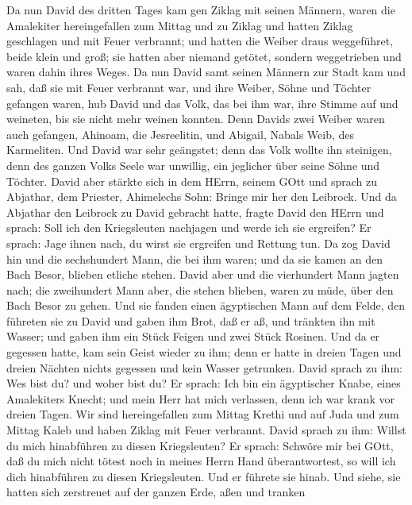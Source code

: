  Da nun David des dritten Tages kam gen Ziklag mit seinen
Männern, waren die Amalekiter hereingefallen zum Mittag und zu Ziklag
und hatten Ziklag geschlagen und mit Feuer verbrannt;  und
hatten die Weiber draus weggeführet, beide klein und groß; sie hatten
aber niemand getötet, sondern weggetrieben und waren dahin ihres Weges.
 Da nun David samt seinen Männern zur Stadt kam und sah, daß
sie mit Feuer verbrannt war, und ihre Weiber, Söhne und Töchter gefangen
waren,  hub David und das Volk, das bei ihm war, ihre Stimme
auf und weineten, bis sie nicht mehr weinen konnten.  Denn
Davids zwei Weiber waren auch gefangen, Ahinoam, die Jesreelitin, und
Abigail, Nabals Weib, des Karmeliten.  Und David war sehr
geängstet; denn das Volk wollte ihn steinigen, denn des ganzen Volks
Seele war unwillig, ein jeglicher über seine Söhne und Töchter. David
aber stärkte sich in dem HErrn, seinem GOtt  und sprach zu
Abjathar, dem Priester, Ahimelechs Sohn: Bringe mir her den Leibrock.
Und da Abjathar den Leibrock zu David gebracht hatte, 
fragte David den HErrn und sprach: Soll ich den Kriegsleuten nachjagen
und werde ich sie ergreifen? Er sprach: Jage ihnen nach, du wirst sie
ergreifen und Rettung tun.  Da zog David hin und die
sechshundert Mann, die bei ihm waren; und da sie kamen an den Bach
Besor, blieben etliche stehen.  David aber und die
vierhundert Mann jagten nach; die zweihundert Mann aber, die stehen
blieben, waren zu müde, über den Bach Besor zu gehen.  Und
sie fanden einen ägyptischen Mann auf dem Felde, den führeten sie zu
David und gaben ihm Brot, daß er aß, und tränkten ihn mit Wasser;
 und gaben ihm ein Stück Feigen und zwei Stück Rosinen. Und
da er gegessen hatte, kam sein Geist wieder zu ihm; denn er hatte in
dreien Tagen und dreien Nächten nichts gegessen und kein Wasser
getrunken.  David sprach zu ihm: Wes bist du? und woher
bist du? Er sprach: Ich bin ein ägyptischer Knabe, eines Amalekiters
Knecht; und mein Herr hat mich verlassen, denn ich war krank vor dreien
Tagen.  Wir sind hereingefallen zum Mittag Krethi und auf
Juda und zum Mittag Kaleb und haben Ziklag mit Feuer verbrannt.
 David sprach zu ihm: Willst du mich hinabführen zu diesen
Kriegsleuten? Er sprach: Schwöre mir bei GOtt, daß du mich nicht tötest
noch in meines Herrn Hand überantwortest, so will ich dich hinabführen
zu diesen Kriegsleuten.  Und er führete sie hinab. Und
siehe, sie hatten sich zerstreuet auf der ganzen Erde, aßen und tranken
